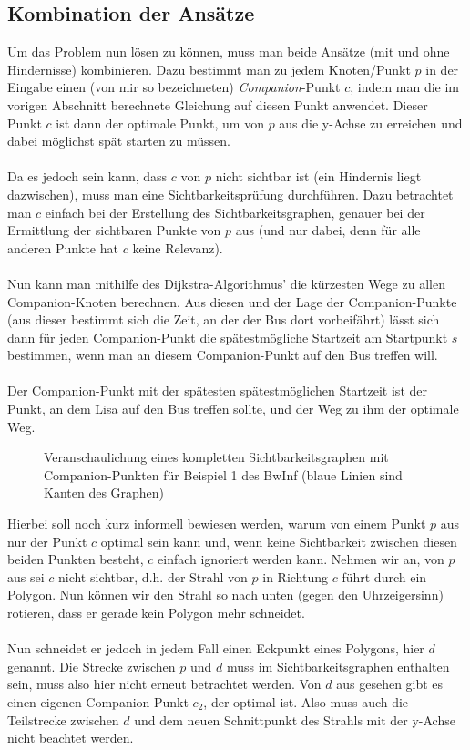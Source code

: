 \documentclass[a4paper, notitlepage, 12pt]{scrartcl}
\begin{document}
 \subsection{Kombination der Ansätze}
 Um das Problem nun lösen zu können, muss man beide Ansätze (mit und ohne Hindernisse) kombinieren. Dazu bestimmt man zu jedem Knoten/Punkt $p$ in der Eingabe einen (von mir so bezeichneten) \textit{Companion}-Punkt $c$, indem man die im vorigen Abschnitt berechnete Gleichung auf diesen Punkt anwendet. Dieser Punkt $c$ ist dann der optimale Punkt, um von $p$ aus die y-Achse zu erreichen und dabei möglichst spät starten zu müssen. \\ \\
 Da es jedoch sein kann, dass $c$ von $p$ nicht sichtbar ist (ein Hindernis liegt dazwischen), muss man eine Sichtbarkeitsprüfung durchführen. Dazu betrachtet man $c$ einfach bei der Erstellung des Sichtbarkeitsgraphen, genauer bei der Ermittlung der sichtbaren Punkte von $p$ aus (und nur dabei, denn für alle anderen Punkte hat $c$ keine Relevanz). \\ \\
 Nun kann man mithilfe des Dijkstra-Algorithmus' die kürzesten Wege zu allen Companion-Knoten berechnen. Aus diesen und der Lage der Companion-Punkte (aus dieser bestimmt sich die Zeit, an der der Bus dort vorbeifährt) lässt sich dann für jeden Companion-Punkt die spätestmögliche Startzeit am Startpunkt $s$ bestimmen, wenn man an diesem Companion-Punkt auf den Bus treffen will. \\ \\
 Der Companion-Punkt mit der spätesten spätestmöglichen Startzeit ist der Punkt, an dem Lisa auf den Bus treffen sollte, und der Weg zu ihm der optimale Weg.
 \begin{figure}[H]
 	\centering 
 	\caption{Veranschaulichung eines kompletten Sichtbarkeitsgraphen mit Companion-Punkten für Beispiel 1 des BwInf (blaue Linien sind Kanten des Graphen)}
 \end{figure}
 Hierbei soll noch kurz informell bewiesen werden, warum von einem Punkt $p$ aus nur der Punkt $c$ optimal sein kann und, wenn keine Sichtbarkeit zwischen diesen beiden Punkten besteht, $c$ einfach ignoriert werden kann. Nehmen wir an, von $p$ aus sei $c$ nicht sichtbar, d.h. der Strahl von $p$ in Richtung $c$ führt durch ein Polygon. Nun können wir den Strahl so nach unten (gegen den Uhrzeigersinn) rotieren, dass er gerade kein Polygon mehr schneidet. \\ \\
 Nun schneidet er jedoch in jedem Fall einen Eckpunkt eines Polygons, hier $d$ genannt. Die Strecke zwischen $p$ und $d$ muss im Sichtbarkeitsgraphen enthalten sein, muss also hier nicht erneut betrachtet werden. Von $d$ aus gesehen gibt es einen eigenen Companion-Punkt $c_2$, der optimal ist. Also muss auch die Teilstrecke zwischen $d$ und dem neuen Schnittpunkt des Strahls mit der y-Achse nicht beachtet werden.
\end{document}
